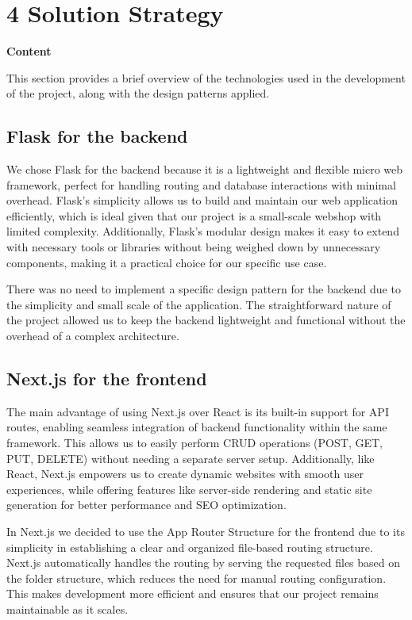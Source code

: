 \hypertarget{section-solution-strategy}{%
\section{4 Solution Strategy}\label{section-solution-strategy}}

\textbf{Content}

This section provides a brief overview of the technologies used in the development of the project, along with the design patterns applied.

\subsection{Flask for the backend}
We chose Flask for the backend because it is a lightweight and flexible micro web framework, perfect for handling routing and database interactions with minimal overhead. Flask’s simplicity allows us to build and maintain our web application efficiently, which is ideal given that our project is a small-scale webshop with limited complexity. Additionally, Flask’s modular design makes it easy to extend with necessary tools or libraries without being weighed down by unnecessary components, making it a practical choice for our specific use case.

There was no need to implement a specific design pattern for the backend due to the simplicity and small scale of the application. The straightforward nature of the project allowed us to keep the backend lightweight and functional without the overhead of a complex architecture.

\subsection{Next.js for the frontend}
The main advantage of using Next.js over React is its built-in support for API routes, enabling seamless integration of backend functionality within the same framework. This allows us to easily perform CRUD operations (POST, GET, PUT, DELETE) without needing a separate server setup. Additionally, like React, Next.js empowers us to create dynamic websites with smooth user experiences, while offering features like server-side rendering and static site generation for better performance and SEO optimization.

In Next.js we decided to use the App Router Structure for the frontend due to its simplicity in establishing a clear and organized file-based routing structure. Next.js automatically handles the routing by serving the requested files based on the folder structure, which reduces the need for manual routing configuration. This makes development more efficient and ensures that our project remains maintainable as it scales.